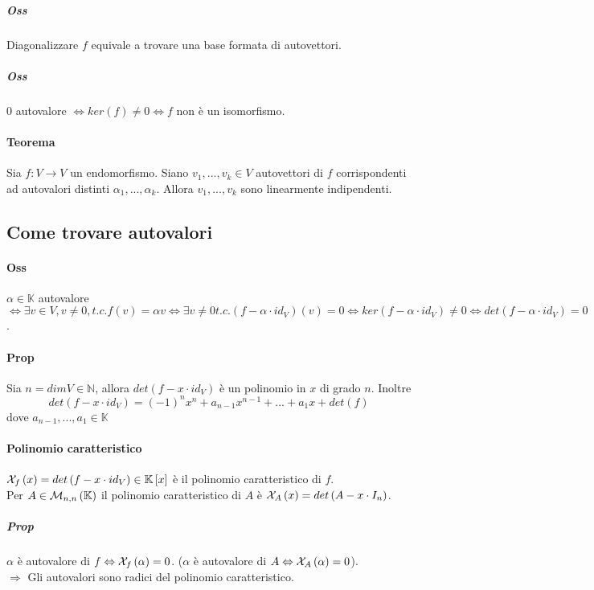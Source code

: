 \documentclass[a4paper,10pt]{article}
\begin{document}
\subparagraph{Oss} Diagonalizzare $f$ equivale a trovare una base formata di
autovettori.

\subparagraph{Oss} $0$ autovalore $\Leftrightarrow ker\left(f\right) \neq 0
\Leftrightarrow f$ non è un isomorfismo.

\paragraph{Teorema} Sia $f: V \rightarrow V$ un endomorfismo. Siano $v_1, ...,
v_k \in V$ autovettori di $f$ corrispondenti ad autovalori distinti $\alpha_1,
..., \alpha_k$. Allora $v_1, ..., v_k$ sono linearmente indipendenti.

\subsection{Come trovare autovalori}
\paragraph{Oss} $\alpha \in \mathbb{K}$ autovalore $\Leftrightarrow \exists
v \in V, v \neq 0, t.c. f\left(v\right) = \alpha v \Leftrightarrow \exists v
\neq 0 t.c. \left(f-\alpha \cdot id_V\right)\left(v\right) = 0 \Leftrightarrow
ker\left(f-\alpha \cdot id_V\right) \neq 0 \Leftrightarrow det\left(f-\alpha
\cdot id_V\right) = 0$.

\paragraph{Prop} Sia $n = dim V \in \mathbb{N}$, allora $det\left(f -
x \cdot id_V\right)$ è un polinomio in $x$ di grado $n$. Inoltre
\[det\left(f - x \cdot id_V\right) = (-1)^n x^n + a_{n-1}x^{n-1} + ... + a_1 x
+ det\left(f\right)\]
dove $a_{n-1},...,a_1 \in \mathbb{K}$

\paragraph{Polinomio caratteristico} ${\cal
X}_f\left(x\right) = det\left(f-x\cdot id_V\right) \in
\mathbb{K}\left[x\right]$ è il polinomio caratteristico di $f$.\\
Per $A \in {\cal M}_{n,n}\left(\mathbb{K}\right)$ il polinomio caratteristico
di $A$ è ${\cal X}_A\left(x\right) = det\left(A - x \cdot I_n\right)$.

\subparagraph{Prop} $\alpha$ è autovalore di $f \Leftrightarrow
{\cal X}_f\left(\alpha\right) = 0$. ($\alpha$ è autovalore di $A \Leftrightarrow
{\cal X}_A\left(\alpha\right) = 0$).\\
$\Rightarrow$ Gli autovalori sono radici del polinomio caratteristico.
\end{document}
